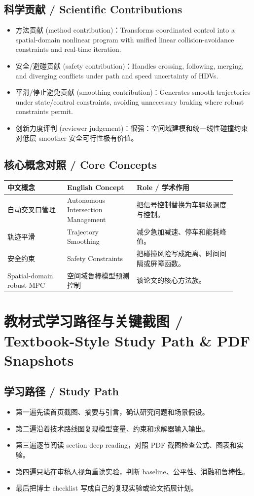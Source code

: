 \documentclass[UTF8,a4paper,11pt,fontset=fandol]{ctexart}
\begin{document}
\subsection{科学贡献 / Scientific Contributions}
\begin{itemize}
\item 方法贡献 (method contribution)：Transforms coordinated control into a spatial-domain nonlinear program with unified linear collision-avoidance constraints and real-time iteration.
\item 安全/避碰贡献 (safety contribution)：Handles crossing, following, merging, and diverging conflicts under path and speed uncertainty of HDVs.
\item 平滑/停止避免贡献 (smoothing contribution)：Generates smooth trajectories under state/control constraints, avoiding unnecessary braking where robust constraints permit.
\item 创新力度评判 (reviewer judgement)：很强：空间域建模和统一线性碰撞约束对低层 smoother 安全可行性极有价值。
\end{itemize}


\subsection{核心概念对照 / Core Concepts}
\begin{longtable}{p{0.24\linewidth}p{0.28\linewidth}p{0.40\linewidth}}
\toprule
中文概念 & English Concept & Role / 学术作用\\
\midrule
自动交叉口管理 & Autonomous Intersection Management & 把信号控制替换为车辆级调度与控制。 \\
轨迹平滑 & Trajectory Smoothing & 减少急加减速、停车和能耗峰值。 \\
安全约束 & Safety Constraints & 把碰撞风险写成距离、时间间隔或屏障函数。 \\
Spatial-domain robust MPC & 空间域鲁棒模型预测控制 & 该论文的核心方法族。 \\
\bottomrule
\end{longtable}

\section{教材式学习路径与关键截图 / Textbook-Style Study Path \& PDF Snapshots}
\subsection{学习路径 / Study Path}
\begin{itemize}
\item 第一遍先读首页截图、摘要与引言，确认研究问题和场景假设。
\item 第二遍沿着技术路线图复现模型变量、约束和求解器输入输出。
\item 第三遍逐节阅读 section deep reading，对照 PDF 截图检查公式、图表和实验。
\item 第四遍只站在审稿人视角重读实验，判断 baseline、公平性、消融和鲁棒性。
\item 最后把博士 checklist 写成自己的复现实验或论文拓展计划。
\end{itemize}
\end{document}
